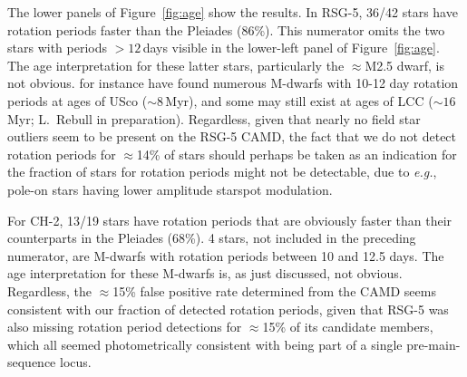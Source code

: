 \documentclass[12pt,twocolumn,linenumbers]{aastex63}
\begin{document}
The lower panels of Figure~\ref{fig:age} show the results.  In RSG-5,
36/42 stars have rotation periods faster than the Pleiades (86\%).
This numerator omits the two stars with periods $>12$\,days visible in
the lower-left panel of Figure~\ref{fig:age}.  The age interpretation
for these latter stars, particularly the $\approx$M2.5 dwarf, is not
obvious.  \citet{rebull_usco_2018} for instance have found numerous
M-dwarfs with 10-12 day rotation periods at ages of USco ($\sim
8$\,Myr), and some may still exist at ages of LCC ($\sim 16$\,Myr;
L.~Rebull in preparation).  Regardless, given that nearly no field
star outliers seem to be present on the RSG-5 CAMD, the fact that we
do not detect rotation periods for $\approx$14\% of stars should
perhaps be taken as an indication for the fraction of stars for
rotation periods might not be detectable, due to {\it e.g.}, pole-on
stars having lower amplitude starspot modulation.

%
%
%

For CH-2, 13/19 stars have rotation periods that are obviously faster
than their counterparts in the Pleiades (68\%).  4 stars, not included
in the preceding numerator, are M-dwarfs with rotation periods between
10 and 12.5 days.  The age interpretation for these M-dwarfs is, as
just discussed, not obvious.  Regardless, the $\approx$15\% false
positive rate determined from the CAMD seems consistent with our
fraction of detected rotation periods, given that RSG-5 was also
missing rotation period detections for $\approx$15\% of its candidate
members, which all seemed photometrically consistent with being part
of a single pre-main-sequence locus.
\end{document}
